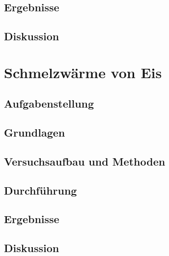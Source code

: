\documentclass{article}
\begin{document}
\subsection{Ergebnisse}
\subsection{Diskussion}
\section{Schmelzwärme von Eis}
\subsection{Aufgabenstellung}
\subsection{Grundlagen}
\subsection{Versuchsaufbau und Methoden}
\subsection{Durchführung}
\subsection{Ergebnisse}
\subsection{Diskussion}
\end{document}
